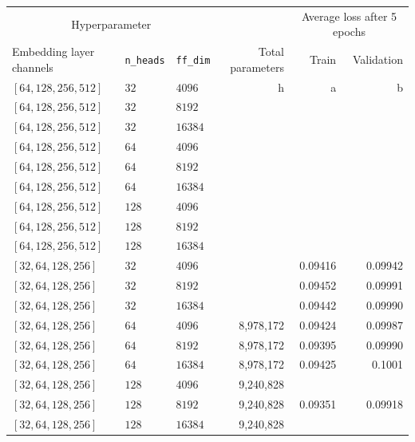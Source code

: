 \begin{table}[H]
  \centering
  \begin{adjustbox}{width=\textwidth}
    \begin{tabular}{lll|rrr}

      \multicolumn{3}{c}{Hyperparameter} && \multicolumn{2}{c}{Average loss
      after 5 epochs} \\

      Embedding layer channels & \texttt{n\_heads} & \texttt{ff\_dim} & Total
      parameters & Train & Validation\\

      \hline

      $[64, 128, 256, 512 ]$& $32$ & $4096$ & h & a & b  \\
      $[64, 128, 256, 512 ]$& $32$ & $8192$ & && \\
      $[64, 128, 256, 512 ]$& $32$ & $16384$ & && \\[0.1cm]

      $[64, 128, 256, 512 ]$& $64$ & $4096$ & && \\
      $[64, 128, 256, 512 ]$& $64$ & $8192$ & && \\
      $[64, 128, 256, 512 ]$& $64$ & $16384$ & && \\[0.1cm]
      
      $[64, 128, 256, 512 ]$& $128$ & $4096$ & && \\
      $[64, 128, 256, 512 ]$& $128$ & $8192$ & && \\
      $[64, 128, 256, 512 ]$& $128$ & $16384$ & && \\[0.5cm]

      

      $[32, 64, 128, 256 ]$& $32$ & $4096$ & & 0.09416 & 0.09942 \\
      $[32, 64, 128, 256 ]$& $32$ & $8192$ & & 0.09452 & 0.09991 \\
      $[32, 64, 128, 256 ]$& $32$ & $16384$ & & 0.09442 & 0.09990 \\[0.1cm]
      
      $[32, 64, 128, 256 ]$& $64$ & $4096$ & 8,978,172 & 0.09424 & 0.09987 \\
      $[32, 64, 128, 256 ]$& $64$ & $8192$ & 8,978,172 & 0.09395 & 0.09990 \\
      $[32, 64, 128, 256 ]$& $64$ & $16384$ & 8,978,172 & 0.09425 & 0.1001 \\[0.1cm]
      
      $[32, 64, 128, 256 ]$& $128$ & $4096$ & 9,240,828 && \\
      $[32, 64, 128, 256 ]$& $128$ & $8192$ & 9,240,828 & 0.09351 & 0.09918 \\
      $[32, 64, 128, 256 ]$& $128$ & $16384$ & 9,240,828 && \\[0.5cm]


\end{tabular}
\end{adjustbox}
\end{table}
